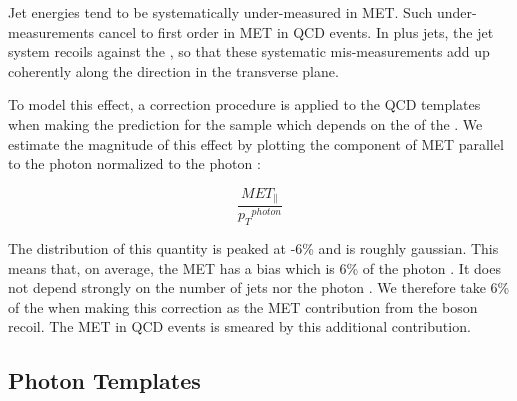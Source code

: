 
Jet energies tend to be systematically under-measured in MET. Such under-measurements cancel to 
first order in MET in QCD events. In \Z plus jets, the jet system recoils against the \Z, so that 
these systematic mis-measurements add up coherently along the \Z direction in the transverse plane.

To model this effect, a correction procedure is applied to the QCD templates when making the 
prediction for the \Z sample which depends on the \pt of the \Z. We estimate the magnitude 
of this effect by plotting
the component of MET parallel to the photon \pt normalized to the photon \pt:

\begin{equation}
\frac{MET_{\parallel}}{{p_T}^{photon}}
\end{equation}

%

The distribution of this quantity is peaked at -6\% and is roughly gaussian. 
This means that, on average, the MET has a bias which is 6\% of the photon \pt.
It does not depend strongly on 
the number of jets nor the photon \pt. We therefore take 6\% of the \Z \pt when making this 
correction as the MET contribution from the boson recoil. 
The MET in QCD events is smeared by this additional contribution.


\subsection{Photon Templates}
\label{sec:templatespho}

